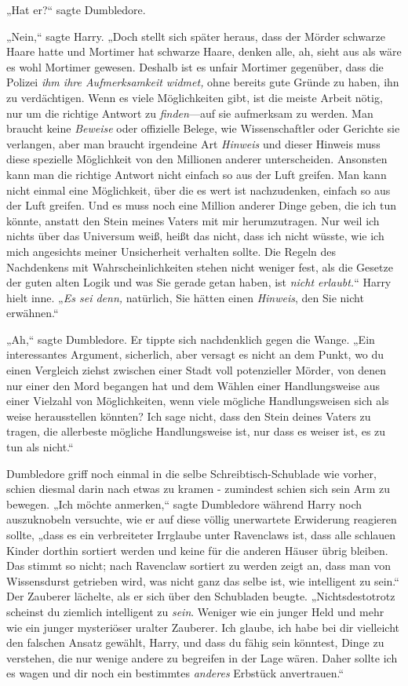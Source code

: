 {„Hat er?“ sagte Dumbledore.

„Nein,“ sagte Harry. „Doch stellt sich später heraus, dass der Mörder schwarze Haare hatte und Mortimer hat schwarze Haare, denken alle, ah, sieht aus als wäre es wohl Mortimer gewesen. Deshalb ist es unfair Mortimer gegenüber, dass die Polizei \emph{ihm ihre Aufmerksamkeit widmet,} ohne bereits gute Gründe zu haben, ihn zu verdächtigen. Wenn es viele Möglichkeiten gibt, ist die meiste Arbeit nötig, nur um die richtige Antwort zu \emph{finden}—auf sie aufmerksam zu werden. Man braucht keine \emph{Beweise} oder offizielle Belege, wie Wissenschaftler oder Gerichte sie verlangen, aber man braucht irgendeine Art \emph{Hinweis} und dieser Hinweis muss diese spezielle Möglichkeit von den Millionen anderer unterscheiden. Ansonsten kann man die richtige Antwort nicht einfach so aus der Luft greifen. Man kann nicht einmal eine Möglichkeit, über die es wert ist nachzudenken, einfach so aus der Luft greifen. Und es muss noch eine Million anderer Dinge geben, die ich tun könnte, anstatt den Stein meines Vaters mit mir herumzutragen. Nur weil ich nichts über das Universum weiß, heißt das nicht, dass ich nicht wüsste, wie ich mich angesichts meiner Unsicherheit verhalten sollte. Die Regeln des Nachdenkens mit Wahrscheinlichkeiten stehen nicht weniger fest, als die Gesetze der guten alten Logik und was Sie gerade getan haben, ist \emph{nicht erlaubt.}“ Harry hielt inne. „\emph{Es sei denn,} natürlich, Sie hätten einen \emph{Hinweis}, den Sie nicht erwähnen.“

„Ah,“ sagte Dumbledore. Er tippte sich nachdenklich gegen die Wange. „Ein interessantes Argument, sicherlich, aber versagt es nicht an dem Punkt, wo du einen Vergleich ziehst zwischen einer Stadt voll potenzieller Mörder, von denen nur einer den Mord begangen hat und dem Wählen einer Handlungsweise aus einer Vielzahl von Möglichkeiten, wenn viele mögliche Handlungsweisen sich als weise herausstellen könnten? Ich sage nicht, dass den Stein deines Vaters zu tragen, die allerbeste mögliche Handlungsweise ist, nur dass es weiser ist, es zu tun als nicht.“

Dumbledore griff noch einmal in die selbe Schreibtisch-Schublade wie vorher, schien diesmal darin nach etwas zu kramen - zumindest schien sich sein Arm zu bewegen. „Ich möchte anmerken,“ sagte Dumbledore während Harry noch auszuknobeln versuchte, wie er auf diese völlig unerwartete Erwiderung reagieren sollte, „dass es ein verbreiteter Irrglaube unter Ravenclaws ist, dass alle schlauen Kinder dorthin sortiert werden und keine für die anderen Häuser übrig bleiben. Das stimmt so nicht; nach Ravenclaw sortiert zu werden zeigt an, dass man von Wissensdurst getrieben wird, was nicht ganz das selbe ist, wie intelligent zu sein.“ Der Zauberer lächelte, als er sich über den Schubladen beugte. „Nichtsdestotrotz scheinst du ziemlich intelligent zu \emph{sein}. Weniger wie ein junger Held und mehr wie ein junger mysteriöser uralter Zauberer. Ich glaube, ich habe bei dir vielleicht den falschen Ansatz gewählt, Harry, und dass du fähig sein könntest, Dinge zu verstehen, die nur wenige andere zu begreifen in der Lage wären. Daher sollte ich es wagen und dir noch ein bestimmtes \emph{anderes} Erbstück anvertrauen.“

}
